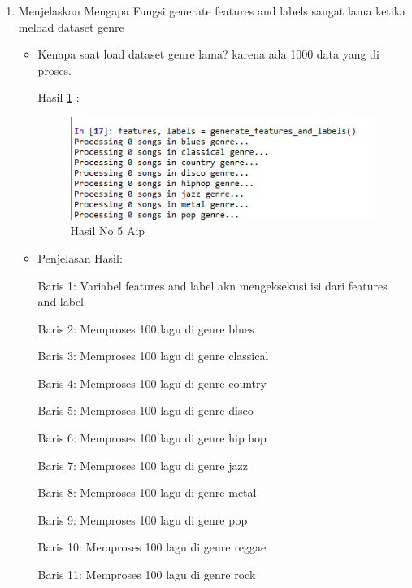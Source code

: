\begin{enumerate}
\item Menjelaskan Mengapa Fungsi generate features and labels sangat lama ketika meload dataset genre
\begin{itemize}
\item Kenapa saat load dataset genre lama? karena ada 1000 data yang di proses.
\par Hasil \ref{no5Aip} :
\begin{figure}[ht]
\centering
\includegraphics[scale=0.7]{figures/AIP/no5aip.PNG}
\caption{Hasil No 5 Aip}
\label{no5Aip}
\end{figure}
\item Penjelasan Hasil:
\par Baris 1: Variabel features and label akn mengeksekusi isi dari features and label
\par Baris 2: Memproses 100 lagu di genre blues
\par Baris 3: Memproses 100 lagu di  genre classical
\par Baris 4: Memproses 100 lagu di  genre country
\par Baris 5: Memproses 100 lagu di  genre disco
\par Baris 6: Memproses 100 lagu di  genre  hip hop
\par Baris 7: Memproses 100 lagu di  genre jazz
\par Baris 8: Memproses 100 lagu di  genre metal
\par Baris 9: Memproses 100 lagu di genre pop
\par Baris 10: Memproses 100 lagu di genre reggae
\par Baris 11: Memproses 100 lagu di genre rock
\end{itemize}
\par


\end{enumerate}

